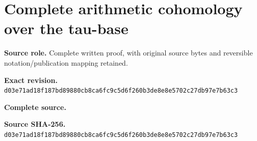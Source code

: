 \begingroup
\sloppy
\small
\makeatletter
\let\EndpointOriginalTagForm\tagform@
\def\tagform@#1{\EndpointOriginalTagForm{TauBase\, #1}}
\makeatother
\section{Complete arithmetic cohomology over the tau-base}
\noindent\textbf{Source role.} Complete written proof, with original source bytes and reversible notation/publication mapping retained.\par
\noindent\textbf{Exact revision.} \nolinkurl{d03e71ad18f187bd89880cb8ca6fc9c5d6f260b3de8e8e5702c27db97e7b63c3}\par
\noindent\textbf{Complete source.} \par
\noindent\textbf{Source SHA-256.} \nolinkurl{d03e71ad18f187bd89880cb8ca6fc9c5d6f260b3de8e8e5702c27db97e7b63c3}\par\medskip

\endgroup
